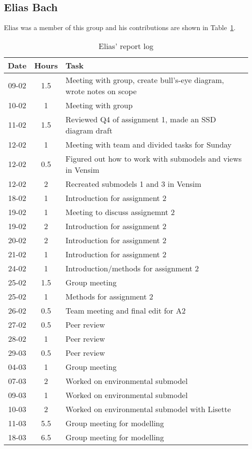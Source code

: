 \subsection{Elias Bach}
Elias was a member of this group and his contributions are shown in Table~\ref{tab:elias_log}. 
\begin{longtable}[c]{c|c|m{35em}}
\caption{Elias' report log}
\label{tab:elias_log}\\
\textbf{Date}& \textbf{Hours} & \textbf{Task} \\
\hline
\endfirsthead
%
\endhead
%
09-02 & 1.5 & Meeting with group, create bull's-eye diagram, wrote notes on scope\\
10-02 & 1 & Meeting with group \\
11-02 & 1.5 & Reviewed Q4 of assignment 1, made an SSD diagram draft \\
12-02 & 1 & Meeting with team and divided tasks for Sunday\\ 
12-02 & 0.5 & Figured out how to work with submodels and views in Vensim \\
12-02 & 2 & Recreated submodels 1 and 3 in Vensim \\
18-02 & 1 & Introduction for assignment 2 \\
19-02 & 1 & Meeting to discuss assignemnt 2\\
19-02 & 2 & Introduction for assignment 2 \\
20-02 & 2 & Introduction for assignment 2 \\
21-02 & 1 & Introduction for assignment 2 \\
24-02 & 1 & Introduction/methods for assignment 2 \\
25-02 & 1.5 & Group meeting \\
25-02 & 1 & Methods for assignment 2 \\
26-02 & 0.5 & Team meeting and final edit for A2 \\
27-02 & 0.5 & Peer review \\
28-02 & 1 & Peer review \\
29-03 & 0.5 & Peer review \\
04-03 & 1 & Group meeting \\
07-03 & 2 & Worked on environmental submodel \\
09-03 & 1 & Worked on environmental submodel \\
10-03 & 2 & Worked on environmental submodel with Lisette \\
11-03 & 5.5 & Group meeting for modelling \\
18-03 & 6.5 & Group meeting for modelling \\

\end{longtable}
